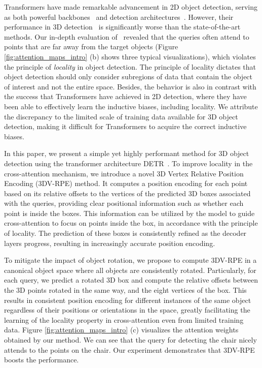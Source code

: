 \documentclass[10pt,twocolumn,letterpaper]{article}
\begin{document}
Transformers have made remarkable advancement in 2D object detection, serving as both powerful backbones~\cite{Vaswani2017attention,liu2021swin} and detection architectures~\cite{carion2020end}. However, their performance in 3D detection~\cite{misra2021-3detr} is significantly worse than the state-of-the-art methods.  Our in-depth evaluation of~\cite{misra2021-3detr} revealed that the queries often attend to points that are far away from the target objects (Figure \ref{fig:attention_maps_intro} (b) shows three typical visualizations), which violates the principle of \emph{locality} in object detection. The principle of locality dictates that object detection should only consider subregions of data that contain the object of interest and not the entire space. 
Besides, the behavior is also in contrast with the success that Transformers have achieved in 2D detection, where they have been able to effectively learn the inductive biases, including locality. We attribute the discrepancy to the limited scale of training data available for 3D object detection, making it difficult for Transformers to acquire the correct inductive biases. 

In this paper, we present a simple yet highly performant method for 3D object detection using the transformer architecture DETR~\cite{carion2020end}. To improve locality in the cross-attention mechanism, we introduce a novel 3D Vertex Relative Position Encoding (3DV-RPE) method. It computes a position encoding for each point based on its relative offsets to the vertices of the predicted 3D boxes associated with the queries, providing clear positional information such as whether each point is inside the boxes. This information can be utilized by the model to guide cross-attention to focus on points inside the box, in accordance with the principle of locality. The prediction of these boxes is consistently refined as the decoder layers progress, resulting in increasingly accurate position encoding. 



To mitigate the impact of object rotation, we propose to compute 3DV-RPE in a canonical object space where all objects are consistently rotated. Particularly, for each query, we predict a rotated 3D box and compute the relative offsets between the 3D points rotated in the same way, and the eight vertices of the box.
This results in consistent position encoding for different instances of the same object regardless of their positions or orientations in the space, greatly facilitating the learning of the locality property in cross-attention even from limited training data. Figure \ref{fig:attention_maps_intro} (c) visualizes the attention weights obtained by our method. We can see that the query for detecting the chair nicely attends to the points on the chair. Our experiment demonstrates that 3DV-RPE boosts the performance. 
\end{document}
